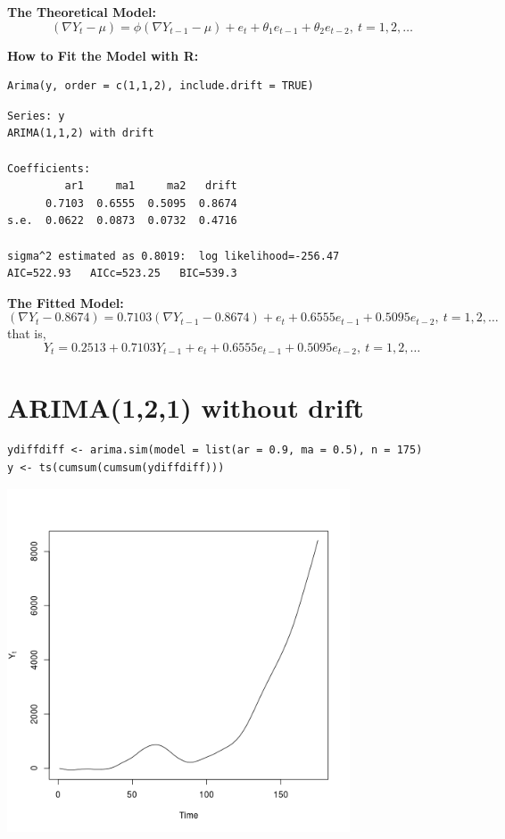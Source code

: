 \documentclass[12pt]{article}
\begin{document}
\noindent
\textbf{The Theoretical Model:} 
\[
(\nabla Y_{t} - \mu) = \phi(\nabla Y_{t - 1} - \mu) +  e_{t} + \theta_{1} e_{t - 1} + \theta_{2} e_{t - 2},\ t = 1,2,\ldots
\]

\noindent
\textbf{How to Fit the Model with R:}


\begin{verbatim}
Arima(y, order = c(1,1,2), include.drift = TRUE)
\end{verbatim}




\begin{verbatim}
Series: y 
ARIMA(1,1,2) with drift         

Coefficients:
         ar1     ma1     ma2   drift
      0.7103  0.6555  0.5095  0.8674
s.e.  0.0622  0.0873  0.0732  0.4716

sigma^2 estimated as 0.8019:  log likelihood=-256.47
AIC=522.93   AICc=523.25   BIC=539.3
\end{verbatim}

\noindent
\textbf{The Fitted Model:} 
\[
(\nabla Y_{t} -  0.8674 ) =  0.7103 (\nabla Y_{t - 1} -  0.8674 ) + e_{t} +  0.6555 e_{t - 1} +  0.5095 e_{t - 2},\ t = 1,2,\ldots
\]
that is,
\[
Y_{t} =  0.2513 +  0.7103 Y_{t - 1} + e_{t} +  0.6555 e_{t - 1} +  0.5095 e_{t - 2},\ t = 1,2,\ldots
\]
\section*{ARIMA(1,2,1) without drift}
\label{sec-9}


\begin{verbatim}
ydiffdiff <- arima.sim(model = list(ar = 0.9, ma = 0.5), n = 175)
y <- ts(cumsum(cumsum(ydiffdiff)))
\end{verbatim}





\includegraphics[width=4.0in]{img/arima121zm.png}
\end{document}
